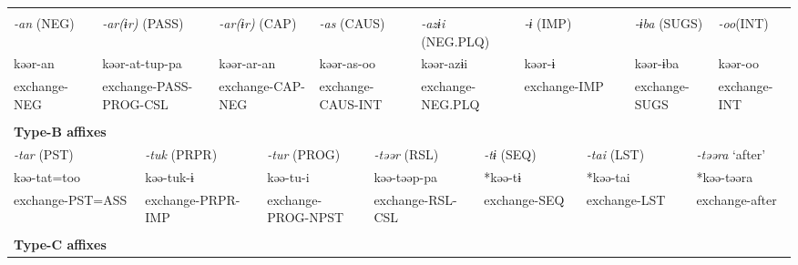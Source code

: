 \tabletail{}
\tablelasttail{}
\begin{tabularx}{\textwidth}{XXXXXXXXXXXXXXXXXXXX}
\lsptoprule
\multicolumn{20}{X}{{\bfseries Type-A affixes}}\\
{ \textit{{}-an} (NEG)} & \multicolumn{3}{X}{{ \textit{{}-ar(ɨr)} (PASS)}} & \multicolumn{4}{X}{{ \textit{{}-ar(ɨr)} (CAP)}} & \multicolumn{4}{X}{{ \textit{{}-as} (CAUS)}} & \multicolumn{3}{X}{{ \textit{{}-azɨi} (NEG.PLQ)}} & \multicolumn{2}{X}{{ \textit{{}-ɨ} (IMP)}} & \multicolumn{2}{X}{{ \textit{{}-ɨba} (SUGS)}} & { \textit{{}-oo}(INT)}\\
{ kəər-an} & \multicolumn{3}{X}{{ kəər-at-tup-pa}} & \multicolumn{4}{X}{{ kəər-ar-an}} & \multicolumn{4}{X}{{ kəər-as-oo}} & \multicolumn{3}{X}{{ kəər-azɨi}} & \multicolumn{2}{X}{{ kəər-ɨ}} & \multicolumn{2}{X}{{ kəər-ɨba}} & { kəər-oo}\\
exchange-NEG & \multicolumn{3}{X}{exchange-PASS-PROG-CSL} & \multicolumn{4}{X}{exchange-CAP-NEG} & \multicolumn{4}{X}{exchange-CAUS-INT} & \multicolumn{3}{X}{exchange-NEG.PLQ} & \multicolumn{2}{X}{exchange-IMP} & \multicolumn{2}{X}{exchange-SUGS} & exchange-INT\\
\multicolumn{20}{X}{}\\
\multicolumn{20}{X}{{\bfseries Type-B affixes}}\\
\multicolumn{2}{X}{{ \textit{{}-tar} (PST)}} & \multicolumn{4}{X}{{ \textit{{}-tuk} (PRPR)}} & \multicolumn{5}{X}{{ \textit{{}-tur} (PROG)}} & \multicolumn{3}{X}{{ \textit{{}-təər} (RSL)}} & \multicolumn{2}{X}{{ \textit{{}-tɨ} (SEQ)}} & \multicolumn{2}{X}{{ \textit{{}-tai} (LST)}} & \multicolumn{2}{X}{{ \textit{{}-təəra} ‘after’}}\\
\multicolumn{2}{X}{{ kəə-tat=too}} & \multicolumn{4}{X}{{ kəə-tuk-ɨ}} & \multicolumn{5}{X}{{ kəə-tu-i}} & \multicolumn{3}{X}{{ kəə-təəp-pa}} & \multicolumn{2}{X}{{ *kəə-tɨ}} & \multicolumn{2}{X}{{ *kəə-tai}} & \multicolumn{2}{X}{{ *kəə-təəra}}\\
\multicolumn{2}{X}{exchange-PST=ASS} & \multicolumn{4}{X}{exchange-PRPR-IMP} & \multicolumn{5}{X}{exchange-PROG-NPST} & \multicolumn{3}{X}{exchange-RSL-CSL} & \multicolumn{2}{X}{exchange-SEQ} & \multicolumn{2}{X}{exchange-LST} & \multicolumn{2}{X}{{ exchange-after}}\\
\multicolumn{2}{X}{} & \multicolumn{4}{X}{} & \multicolumn{5}{X}{} & \multicolumn{3}{X}{} & \multicolumn{2}{X}{} & \multicolumn{2}{X}{} & \multicolumn{2}{X}{}\\
\multicolumn{20}{X}{{\bfseries Type-C affixes}}\\

\end{tabularx}

